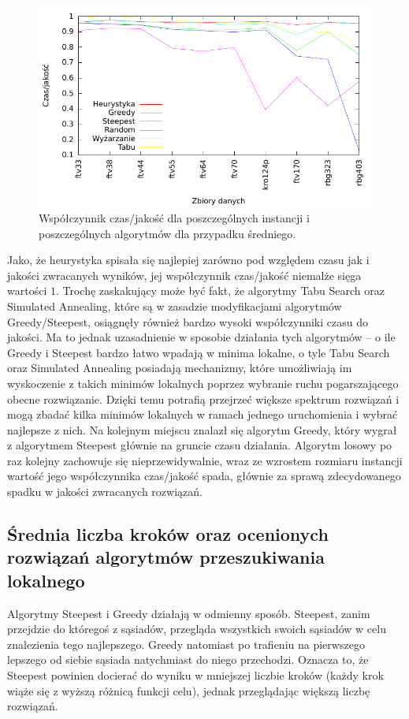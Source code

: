 \begin{figure}[!h]
\centering\includegraphics[width=12cm]{img/jakosc-czas}
\caption{Współczynnik czas/jakość dla poszczególnych instancji i poszczególnych algorytmów dla przypadku średniego.}\label{rys:czas_jakosc}
\end{figure}

Jako, że heurystyka spisała się najlepiej zarówno pod względem czasu jak i jakości zwracanych wyników, jej współczynnik czas/jakość niemalże sięga wartości $1$. Trochę zaskakujący może być fakt, że algorytmy Tabu Search oraz Simulated Annealing, które są w zasadzie modyfikacjami algorytmów Greedy/Steepest, osiągnęły również bardzo wysoki współczynniki czasu do jakości. Ma to jednak uzasadnienie w sposobie działania tych algorytmów -- o ile Greedy i Steepest bardzo łatwo wpadają w minima lokalne, o tyle Tabu Search oraz Simulated Annealing posiadają mechanizmy, które umożliwiają im wyskoczenie z takich minimów lokalnych poprzez wybranie ruchu pogarszającego obecne rozwiązanie. Dzięki temu potrafią przejrzeć większe spektrum rozwiązań i mogą zbadać kilka minimów lokalnych w ramach jednego uruchomienia i wybrać najlepsze z nich. Na kolejnym miejscu znalazł się algorytm Greedy, który wygrał z algorytmem Steepest głównie na gruncie czasu działania. Algorytm losowy po raz kolejny zachowuje się nieprzewidywalnie, wraz ze wzrostem rozmiaru instancji wartość jego współczynnika czas/jakość spada, głównie za sprawą zdecydowanego spadku w jakości zwracanych rozwiązań.

\subsection{Średnia liczba kroków oraz ocenionych rozwiązań algorytmów przeszukiwania lokalnego}
Algorytmy Steepest i Greedy działają w odmienny sposób. Steepest, zanim przejdzie do któregoś z sąsiadów, przegląda wszystkich swoich sąsiadów w celu znalezienia tego najlepszego. Greedy natomiast po trafieniu na pierwszego lepszego od siebie sąsiada natychmiast do niego przechodzi. Oznacza to, że Steepest powinien docierać do wyniku w mniejszej liczbie kroków (każdy krok wiąże się z wyższą różnicą funkcji celu), jednak przeglądając większą liczbę rozwiązań.

